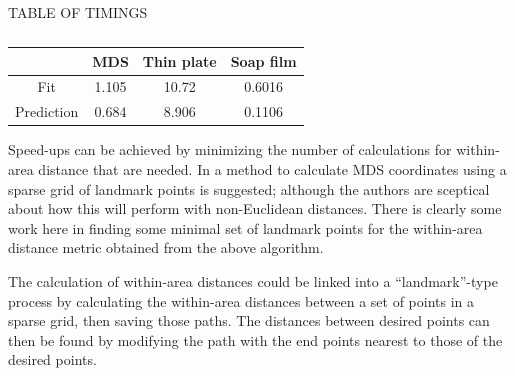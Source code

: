 \documentclass[a4paper,10pt]{article}
\begin{document}
TABLE OF TIMINGS

\begin{table}[ht]
\centering
\begin{tabular}{c || c c c}
 & MDS & Thin plate & Soap film\\ 
\hline
Fit & 1.105 & 10.72  & 0.6016 \\
Prediction & 0.684 & 8.906 & 0.1106 \\
\end{tabular}
\label{ramsaytime}
\caption{}
\end{table}








Speed-ups can be achieved by minimizing the number of calculations for within-area distance that are needed. In \cite{landmark} a method to calculate MDS coordinates using a sparse grid of landmark points is suggested; although the authors are sceptical about how this will perform with non-Euclidean distances. There is clearly some work here in finding some minimal set of landmark points for the within-area distance metric obtained from the above algorithm.

The calculation of within-area distances could be linked into a ``landmark''-type process by calculating the within-area distances between a set of points in a sparse grid, then saving those paths. The distances between desired points can then be found by modifying the path with the end points nearest to those of the desired points.




\end{document}
